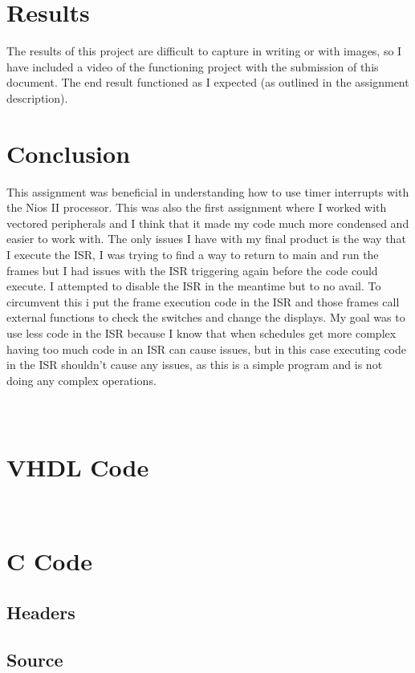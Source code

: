 \documentclass[10pt,a4paper]{article}
\begin{document}
	\section{Results}
	The results of this project are difficult to capture in writing or with images, so I have included a video of the functioning project with the submission of this document. The end result functioned as I expected (as outlined in the assignment description).

	\section{Conclusion}
	This assignment was beneficial in understanding how to use timer interrupts with the Nios II processor. This was also the first assignment where I worked with vectored peripherals and I think that it made my code much more condensed and easier to work with. The only issues I have with my final product is the way that I execute the ISR, I was trying to find a way to return to main and run the frames but I had issues with the ISR triggering again before the code could execute. I attempted to disable the ISR in the meantime but to no avail. To circumvent this i put the frame execution code in the ISR and those frames call external functions to check the switches and change the displays. My goal was to use less code in the ISR because I know that when schedules get more complex having too much code in an ISR can cause issues, but in this case executing code in the ISR shouldn't cause any issues, as this is a simple program and is not doing any complex operations.
	\clearpage
	\appendix
	\section{\\VHDL Code}
	
	
	\section{\\C Code}
	\subsection{Headers}
	
	
	\subsection{Source}
	
\end{document}

